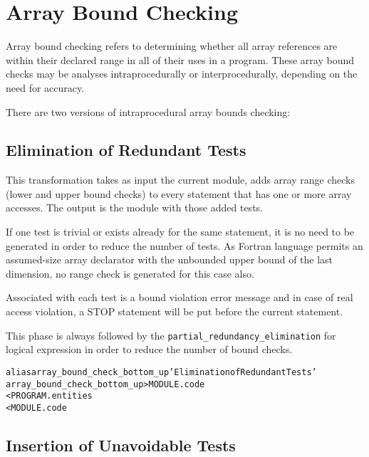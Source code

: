 \documentclass[a4paper]{report}
\newenvironment{PipsMake}{\begin{alltt}}{\end{alltt}}
\begin{document}

\section{Array Bound Checking}
\label{subsection-array-bound-checking}

Array bound checking refers to determining whether all array references
are within their declared range in all of their uses in a program. These
array  bound checks may be analyses intraprocedurally or
interprocedurally, depending on the need for accuracy.

There are two versions of intraprocedural array bounds checking:

\subsection{Elimination of Redundant Tests}
\label{subsection-array-bound-check_bottom_up}

This transformation takes as input the current module, adds array range
checks (lower and upper bound checks) to every statement that has one or
more array accesses. The output is the module with those added tests.

If one test is trivial or exists already for the same statement, it is
no need to be generated in order to reduce the
number of tests.  As Fortran language permits an assumed-size array
declarator with the unbounded upper bound of the last dimension, no range check is generated for this case also.

Associated with each test is a bound violation error message and in case
of real access violation, a STOP statement will be put before the current
statement.

This phase is always followed by the \verb/partial_redundancy_elimination/ for logical
expression in order to reduce the number of bound checks. 

\begin{PipsMake}
alias array_bound_check_bottom_up 'Elimination of Redundant Tests'
array_bound_check_bottom_up            > MODULE.code
        < PROGRAM.entities
        < MODULE.code
\end{PipsMake}


\subsection{Insertion of Unavoidable Tests}
\label{subsection-array-bound-check_top_down}
\end{document}
